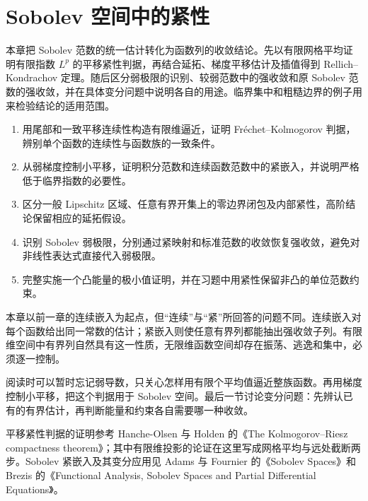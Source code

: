 \chapter{Sobolev 空间中的紧性}
\label{b1:ch:25}
\begin{chapterabstract}
本章把 Sobolev 范数的统一估计转化为函数列的收敛结论。先以有限网格平均证明有限指数 \(L^p\) 的平移紧性判据，再结合延拓、梯度平移估计及插值得到 Rellich–Kondrachov 定理。随后区分弱极限的识别、较弱范数中的强收敛和原 Sobolev 范数的强收敛，并在具体变分问题中说明各自的用途。临界集中和粗糙边界的例子用来检验结论的适用范围。
\end{chapterabstract}

\begin{learninggoals}
\begin{enumerate}
\item\label{b1:goal:25-fk}用尾部和一致平移连续性构造有限维逼近，证明 Fréchet–Kolmogorov 判据，辨别单个函数的连续性与函数族的一致条件。
\item\label{b1:goal:25-rellich}从弱梯度控制小平移，证明积分范数和连续函数范数中的紧嵌入，并说明严格低于临界指数的必要性。
\item\label{b1:goal:25-boundary}区分一般 Lipschitz 区域、任意有界开集上的零边界闭包及内部紧性，高阶结论保留相应的延拓假设。
\item\label{b1:goal:25-weak}识别 Sobolev 弱极限，分别通过紧映射和标准范数的收敛恢复强收敛，避免对非线性表达式直接代入弱极限。
\item\label{b1:goal:25-variation}完整实施一个凸能量的极小值证明，并在习题中用紧性保留非凸的单位范数约束。
\end{enumerate}
\end{learninggoals}

本章以前一章的连续嵌入为起点，但“连续”与“紧”所回答的问题不同。连续嵌入对每个函数给出同一常数的估计；紧嵌入则使任意有界列都能抽出强收敛子列。有限维空间中有界列自然具有这一性质，无限维函数空间却存在振荡、逃逸和集中，必须逐一控制。

\ProseParagraphBreak

阅读时可以暂时忘记弱导数，只关心怎样用有限个平均值逼近整族函数。再用梯度控制小平移，把这个判据用于 Sobolev 空间。最后一节讨论变分问题：先辨认已有的有界估计，再判断能量和约束各自需要哪一种收敛。

\ProseParagraphBreak

平移紧性判据的证明参考 Hanche-Olsen 与 Holden 的《The Kolmogorov--Riesz compactness theorem》\cite[Section 3]{HancheOlsenHolden2010Compactness}；其中有限维投影的论证在这里写成网格平均与远处截断两步。Sobolev 紧嵌入及其变分应用见 Adams 与 Fournier 的《Sobolev Spaces》\cite{Adams2003Sobolev}和 Brezis 的《Functional Analysis, Sobolev Spaces and Partial Differential Equations》\cite{Brezis2011Functional}。

